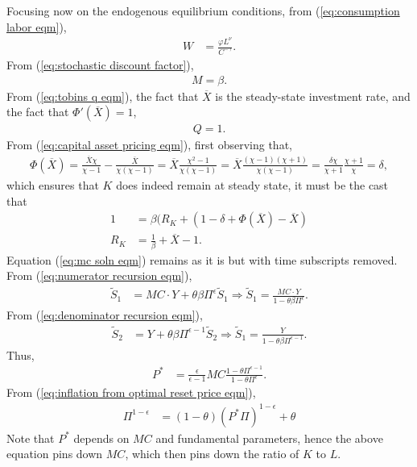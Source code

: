 \documentclass[12 pt, oneside]{article}
\theoremstyle{definition}
\theoremstyle{definition}
\theoremstyle{definition}
\begin{document}
Focusing now on the endogenous equilibrium conditions, from (\ref{eq:consumption labor eqm}),
\begin{align*}
  W & = \frac{\varphi L^\nu}{C^{-\gamma}}.
\end{align*}
From (\ref{eq:stochastic discount factor}),
\begin{align*}
  M = \beta.
\end{align*}
From (\ref{eq:tobins q eqm}), the fact that $\overline{X}$ is the steady-state investment rate, and the fact that $\Phi'(\overline{X}) = 1$,
\begin{align*}
  Q = 1.
\end{align*}
From (\ref{eq:capital asset pricing eqm}), first observing that,
\begin{align*}
  \Phi(\overline{X}) = \frac{\overline{X}\chi}{\chi - 1} - \frac{\overline{X}}{\chi (\chi - 1)} = \overline{X}\frac{\chi^2 - 1}{\chi(\chi - 1)} = \overline{X}\frac{(\chi - 1)(\chi + 1)}{\chi (\chi - 1)} = \frac{\delta\chi}{\chi + 1}\frac{\chi + 1}{\chi} = \delta,
\end{align*}
which ensures that $K$ does indeed remain at steady state, it must be the cast that
\begin{align*}
  1 & = \beta(R_K + (1 - \delta + \Phi(\overline{X}) - \overline{X})\\
  R_K & = \frac{1}{\beta} + \overline{X} - 1.
\end{align*}
Equation (\ref{eq:mc soln eqm}) remains as it is but with time subscripts removed. From (\ref{eq:numerator recursion eqm}),
\begin{align*}
  \tilde{S}_1 & = MC \cdot Y + \theta \beta \Pi^\epsilon \tilde{S}_1 \Rightarrow \tilde{S}_1 = \frac{MC\cdot Y}{1 - \theta\beta \Pi^\epsilon}.
\end{align*}
From (\ref{eq:denominator recursion eqm}),
\begin{align*}
  \tilde{S}_2 & = Y + \theta\beta \Pi^{\epsilon - 1}\tilde{S}_2 \Rightarrow \tilde{S}_1 = \frac{Y}{1 - \theta\beta \Pi^{\epsilon - 1}}.
\end{align*}
Thus,
\begin{align*}
  P^* & = \frac{\epsilon}{\epsilon - 1}MC \frac{1 - \theta \Pi^{\epsilon - 1}}{1 - \theta \Pi^{\epsilon}}.
\end{align*}
From (\ref{eq:inflation from optimal reset price eqm}),
\begin{align*}
  \Pi^{1 - \epsilon} & = ( 1- \theta) \left(P^* \Pi\right)^{1 - \epsilon} + \theta
\end{align*}
Note that $P^*$ depends on $MC$ and fundamental parameters, hence the above equation pins down $MC$, which then pins down the ratio of $K$ to $L$.
\end{document}
